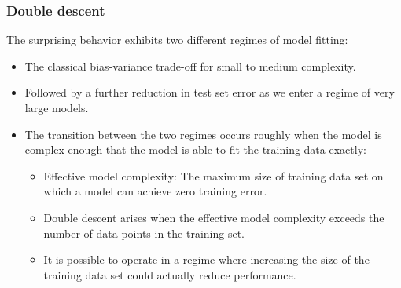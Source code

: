 \documentclass{beamer}
\begin{document}
\begin{frame}
    \frametitle{Double descent}
    The surprising behavior exhibits two different regimes of model fitting:
    \begin{itemize}
        \item The classical bias-variance trade-off for small to medium complexity.
        \item Followed by a further reduction in test set error as we enter a regime of very large models.
        \item The transition between the two regimes occurs roughly when the model is complex enough that the model is able to fit the training data exactly:
        \begin{itemize}
            \item Effective model complexity: The maximum size of training data set on which a model can achieve zero training error.
            \item Double descent arises when the effective model complexity exceeds the number of data points in the training set.
            \item It is possible to operate in a regime where increasing the size of the training data set could actually reduce performance.
        \end{itemize}
    \end{itemize}
\end{frame}
\end{document}
